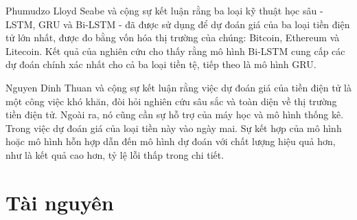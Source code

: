 \documentclass[conference]{IEEEtran}
\begin{document}
Phumudzo Lloyd Seabe và cộng sự \cite{b7} kết luận rằng ba loại kỹ thuật học sâu - LSTM, GRU và Bi-LSTM - đã được sử dụng để dự đoán giá của ba loại tiền điện tử lớn nhất, được đo bằng vốn hóa thị trường của chúng: Bitcoin, Ethereum và Litecoin. Kết quả của nghiên cứu cho thấy rằng mô hình Bi-LSTM cung cấp các dự đoán chính xác nhất cho cả ba loại tiền tệ, tiếp theo là mô hình GRU.\par
Nguyen Dinh Thuan và cộng sự \cite{b8} kết luận rằng việc dự đoán giá của tiền điện tử là một công việc khó khăn, đòi hỏi nghiên cứu sâu sắc và toàn diện về thị trường tiền điện tử. Ngoài ra, nó cũng cần sự hỗ trợ của máy học và mô hình thống kê. Trong việc dự đoán giá của loại tiền này vào ngày mai. Sự kết hợp của mô hình hoặc mô hình hỗn hợp dẫn đến mô hình dự đoán với chất lượng hiệu quả hơn, như là kết quả cao hơn, tỷ lệ lỗi thấp trong chi tiết.

\section{Tài nguyên}
\end{document}
